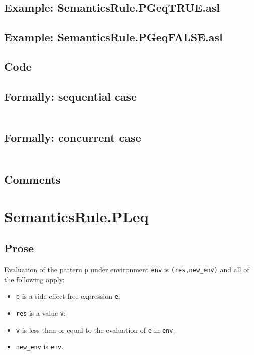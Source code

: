 \documentclass{book}
\begin{document}
    \subsection{Example: SemanticsRule.PGeqTRUE.asl}

    \subsection{Example: SemanticsRule.PGeqFALSE.asl}

  \subsection{Code}

  \subsection{Formally: sequential case}
  \begin{align}
  \end{align} 

  \subsection{Formally: concurrent case}
  \begin{align}
  \end{align} 

  \subsection{Comments}

\section{SemanticsRule.PLeq \label{sec:SemanticsRule.PLeq}}

    \subsection{Prose}

   Evaluation of the pattern \texttt{p} under environment \texttt{env} is
  \texttt{(res,new\_env)} and all of the following apply:
    \begin{itemize}
    \item \texttt{p} is a side-effect-free expression \texttt{e};
    \item \texttt{res} is a value \texttt{v};
    \item \texttt{v} is less than or equal to the evaluation of \texttt{e} in \texttt{env};
    \item \texttt{new\_env} is \texttt{env}.
    \end{itemize}
\end{document}
